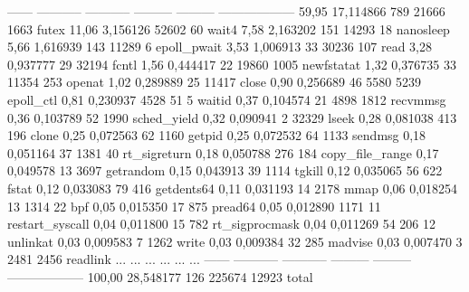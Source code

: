 \begin{myverbatim}
------ ----------- ----------- --------- --------- ------------------
 59,95   17,114866         789     21666      1663 futex
 11,06    3,156126       52602        60           wait4
  7,58    2,163202         151     14293        18 nanosleep
  5,66    1,616939         143     11289         6 epoll_pwait
  3,53    1,006913          33     30236       107 read
  3,28    0,937777          29     32194           fcntl
  1,56    0,444417          22     19860      1005 newfstatat
  1,32    0,376735          33     11354       253 openat
  1,02    0,289889          25     11417           close
  0,90    0,256689          46      5580      5239 epoll_ctl
  0,81    0,230937        4528        51         5 waitid
  0,37    0,104574          21      4898      1812 recvmmsg
  0,36    0,103789          52      1990           sched_yield
  0,32    0,090941           2     32329           lseek
  0,28    0,081038         413       196           clone
  0,25    0,072563          62      1160           getpid
  0,25    0,072532          64      1133           sendmsg
  0,18    0,051164          37      1381        40 rt_sigreturn
  0,18    0,050788         276       184           copy_file_range
  0,17    0,049578          13      3697           getrandom
  0,15    0,043913          39      1114           tgkill
  0,12    0,035065          56       622           fstat
  0,12    0,033083          79       416           getdents64
  0,11    0,031193          14      2178           mmap
  0,06    0,018254          13      1314        22 bpf
  0,05    0,015350          17       875           pread64
  0,05    0,012890        1171        11           restart_syscall
  0,04    0,011800          15       782           rt_sigprocmask
  0,04    0,011269          54       206        12 unlinkat
  0,03    0,009583           7      1262           write
  0,03    0,009384          32       285           madvise
  0,03    0,007470           3      2481      2456 readlink
   ...         ...         ...       ...       ... ...   
------ ----------- ----------- --------- --------- ------------------
100,00   28,548177         126    225674     12923 total
\end{myverbatim}